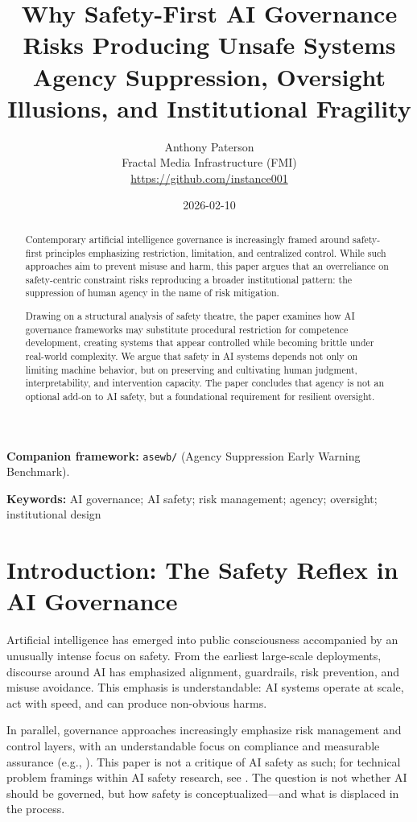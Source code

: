 \documentclass[11pt]{article}
\title{Why Safety-First AI Governance Risks Producing Unsafe Systems\\\large Agency Suppression, Oversight Illusions, and Institutional Fragility}
\author{Anthony Paterson\\Fractal Media Infrastructure (FMI)\\\url{https://github.com/instance001}}
\date{2026-02-10}
\begin{document}
\maketitle

\noindent\textbf{Companion framework:} \texttt{asewb/} (Agency Suppression Early Warning Benchmark).

\begin{abstract}
Contemporary artificial intelligence governance is increasingly framed around
safety-first principles emphasizing restriction, limitation, and centralized control.
While such approaches aim to prevent misuse and harm, this paper argues that an
overreliance on safety-centric constraint risks reproducing a broader institutional
pattern: the suppression of human agency in the name of risk mitigation.

Drawing on a structural analysis of safety theatre, the paper examines how AI
governance frameworks may substitute procedural restriction for competence development,
creating systems that appear controlled while becoming brittle under real-world
complexity. We argue that safety in AI systems depends not only on limiting machine
behavior, but on preserving and cultivating human judgment, interpretability, and
intervention capacity. The paper concludes that agency is not an optional add-on to AI
safety, but a foundational requirement for resilient oversight.
\end{abstract}

\noindent\textbf{Keywords:} AI governance; AI safety; risk management; agency; oversight; institutional design

\section{Introduction: The Safety Reflex in AI Governance}

Artificial intelligence has emerged into public consciousness accompanied by an
unusually intense focus on safety. From the earliest large-scale deployments, discourse
around AI has emphasized alignment, guardrails, risk prevention, and misuse avoidance.
This emphasis is understandable: AI systems operate at scale, act with speed, and can
produce non-obvious harms.

In parallel, governance approaches increasingly emphasize risk management and control
layers, with an understandable focus on compliance and measurable assurance (e.g.,
\citet{NIST2023AIRMF}). This paper is not a critique of AI safety as such; for technical
problem framings within AI safety research, see \citet{Amodei2016Concrete}. The question
is not whether AI should be governed, but how safety is conceptualized---and what is
displaced in the process.
\end{document}
